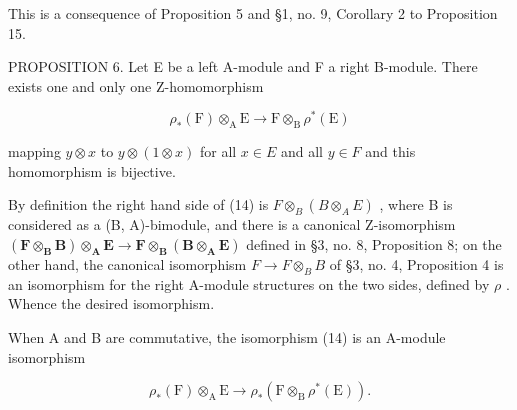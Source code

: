 This is a consequence of Proposition 5 and §1, no. 9, Corollary 2 to Proposition 15.

PROPOSITION 6. Let E be a left A-module and F a right B-module. There exists one and only one Z-homomorphism

\[
\rho_ {*} (\mathrm{F}) \otimes_ {\mathrm{A}} \mathrm{E} \rightarrow \mathrm{F} \otimes_ {\mathrm{B}} \rho^ {*} (\mathrm{E})\tag{14}
\]

mapping \(y \otimes x\) to \(y \otimes (1 \otimes x)\) for all \(x \in E\) and all \(y \in F\) and this homomorphism is bijective.

By definition the right hand side of (14) is \(F \otimes_{B} (B \otimes_{A} E)\) , where B is considered as a (B, A)-bimodule, and there is a canonical Z-isomorphism \((\mathbf{F} \otimes_{\mathbf{B}} \mathbf{B}) \otimes_{\mathbf{A}} \mathbf{E} \to \mathbf{F} \otimes_{\mathbf{B}} (\mathbf{B} \otimes_{\mathbf{A}} \mathbf{E})\) defined in §3, no. 8, Proposition 8; on the other hand, the canonical isomorphism \(F \to F \otimes_{B} B\) of §3, no. 4, Proposition 4 is an isomorphism for the right A-module structures on the two sides, defined by \(\rho\) . Whence the desired isomorphism.

When A and B are commutative, the isomorphism (14) is an A-module isomorphism

\[
\rho_ {*} (\mathrm{F}) \otimes_ {\mathrm{A}} \mathrm{E} \rightarrow \rho_ {*} (\mathrm{F} \otimes_ {\mathrm{B}} \rho^ {*} (\mathrm{E})).
\]

